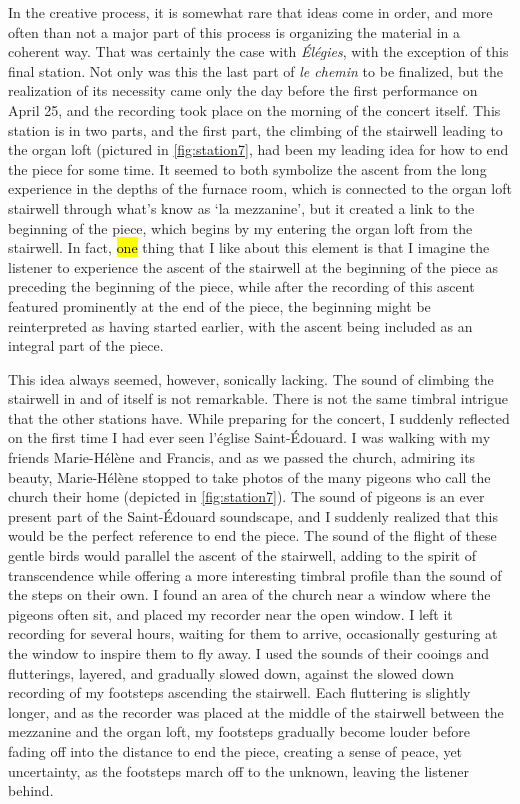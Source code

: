 \documentclass[12pt,twoside,maitrise]{dms_ks}
\theoremstyle{definition}
\begin{document}
{In the creative process, it is somewhat rare that ideas come in order, and more often than not a major part of this process is organizing the material in a coherent way. 
That was certainly the case with \textit{Élégies}, with the exception of this final station. 
Not only was this the last part of \textit{le chemin} to be finalized, but the realization of its necessity came only the day before the first performance on April 25, and the recording took place on the morning of the concert itself. 
This station is in two parts, and the first part, the climbing of the stairwell leading to the organ loft (pictured in \cref{fig:station7}, had been my leading idea for how to end the piece for some time. 
It seemed to both symbolize the ascent from the long experience in the depths of the furnace room, which is connected to the organ loft stairwell through what's know as `la mezzanine', but it created a link to the beginning of the piece, which begins by my entering the organ loft from the stairwell. 
In fact, \hl{one} thing that I like about this element is that I imagine the listener to experience the ascent of the stairwell at the beginning of the piece as preceding the beginning of the piece, while after the recording of this ascent featured prominently at the end of the piece, the beginning might be reinterpreted as having started earlier, with the ascent being included as an integral part of the piece.

This idea always seemed, however, sonically lacking. 
The sound of climbing the stairwell in and of itself is not remarkable. 
There is not the same timbral intrigue that the other stations have. 
While preparing for the concert, I suddenly reflected on the first time I had ever seen l'église Saint-Édouard. 
I was walking with my friends Marie-Hélène and Francis, and as we passed the church, admiring its beauty, Marie-Hélène stopped to take photos of the many pigeons who call the church their home (depicted in \cref{fig:station7}). 
The sound of pigeons is an ever present part of the Saint-Édouard soundscape, and I suddenly realized that this would be the perfect reference to end the piece. 
The sound of the flight of these gentle birds would parallel the ascent of the stairwell, adding to the spirit of transcendence while offering a more interesting timbral profile than the sound of the steps on their own. 
I found an area of the church near a window where the pigeons often sit, and placed my recorder near the open window. 
I left it recording for several hours, waiting for them to arrive, occasionally gesturing at the window to inspire them to fly away. 
I used the sounds of their cooings and flutterings, layered, and gradually slowed down, against the slowed down recording of my footsteps ascending the stairwell. 
Each fluttering is slightly longer, and as the recorder was placed at the middle of the stairwell between the mezzanine and the organ loft, my footsteps gradually become louder before fading off into the distance to end the piece, creating a sense of peace, yet uncertainty, as the footsteps march off to the unknown, leaving the listener behind.

}
\end{document}

